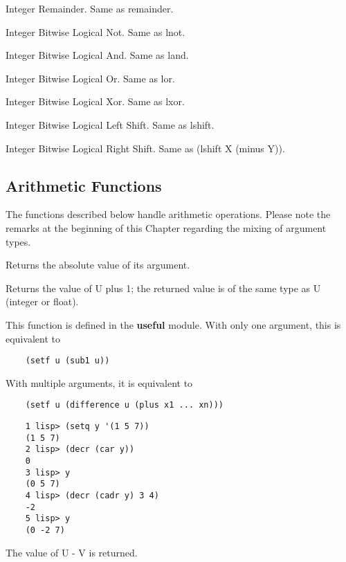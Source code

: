 {    Integer Remainder.  Same as remainder.
}

{    Integer Bitwise Logical Not.  Same as lnot.
}

{    Integer Bitwise Logical And.  Same as land.
}

{    Integer Bitwise Logical Or.  Same as lor.
}

{    Integer Bitwise Logical Xor.  Same as lxor.
}

{    Integer Bitwise Logical Left Shift.  Same as lshift.
}

{    Integer Bitwise Logical Right Shift. Same as (lshift  X
    (minus Y)).
}
\subsection{Arithmetic Functions}

  The  functions  described  below handle arithmetic operations.
Please note  the  remarks  at  the  beginning  of  this  Chapter
regarding the mixing of argument types.


{    Returns the absolute value of its argument.
}

{    Returns  the value of U plus 1; the returned value is of the
    same type as U (integer or float).
}

{    This function is defined in the {\bf useful} module. With only
    one argument, this is equivalent to
}
\begin{verbatim}
    (setf u (sub1 u))
\end{verbatim}
    With multiple arguments, it is equivalent to

\begin{verbatim}
    (setf u (difference u (plus x1 ... xn)))
\end{verbatim}
\begin{verbatim}
    1 lisp> (setq y '(1 5 7))
    (1 5 7)
    2 lisp> (decr (car y))
    0
    3 lisp> y
    (0 5 7)
    4 lisp> (decr (cadr y) 3 4)
    -2
    5 lisp> y
    (0 -2 7)
\end{verbatim}
{    The value of U - V is returned.
}

